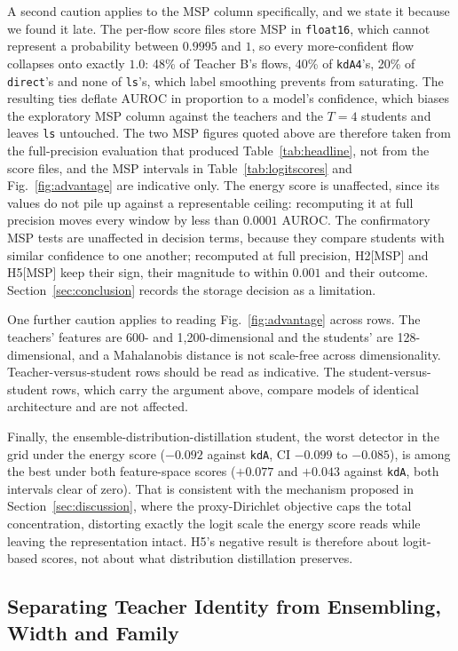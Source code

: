 \documentclass[journal]{IEEEtran}
\newcommand{\kd}[1]{\texttt{#1}}
\begin{document}
A second caution applies to the MSP column specifically, and we state it because we found it late. The per-flow score files store MSP in \texttt{float16}, which cannot represent a probability between $0.9995$ and $1$, so every more-confident flow collapses onto exactly $1.0$: 48\% of Teacher B's flows, 40\% of \kd{kdA4}'s, 20\% of \kd{direct}'s and none of \kd{ls}'s, which label smoothing prevents from saturating. The resulting ties deflate AUROC in proportion to a model's confidence, which biases the exploratory MSP column against the teachers and the $T=4$ students and leaves \kd{ls} untouched. The two MSP figures quoted above are therefore taken from the full-precision evaluation that produced Table~\ref{tab:headline}, not from the score files, and the MSP intervals in Table~\ref{tab:logitscores} and Fig.~\ref{fig:advantage} are indicative only. The energy score is unaffected, since its values do not pile up against a representable ceiling: recomputing it at full precision moves every window by less than $0.0001$ AUROC. The confirmatory MSP tests are unaffected in decision terms, because they compare students with similar confidence to one another; recomputed at full precision, H2[MSP] and H5[MSP] keep their sign, their magnitude to within $0.001$ and their outcome. Section~\ref{sec:conclusion} records the storage decision as a limitation.

One further caution applies to reading Fig.~\ref{fig:advantage} across rows. The teachers' features are 600- and 1{,}200-dimensional and the students' are 128-dimensional, and a Mahalanobis distance is not scale-free across dimensionality. Teacher-versus-student rows should be read as indicative. The student-versus-student rows, which carry the argument above, compare models of identical architecture and are not affected.

Finally, the ensemble-distribution-distillation student, the worst detector in the grid under the energy score ($-0.092$ against \kd{kdA}, CI $-0.099$ to $-0.085$), is among the best under both feature-space scores ($+0.077$ and $+0.043$ against \kd{kdA}, both intervals clear of zero). That is consistent with the mechanism proposed in Section~\ref{sec:discussion}, where the proxy-Dirichlet objective caps the total concentration, distorting exactly the logit scale the energy score reads while leaving the representation intact. H5's negative result is therefore about logit-based scores, not about what distribution distillation preserves.

\subsection{Separating Teacher Identity from Ensembling, Width and Family}
\label{sec:swaps}
\end{document}
